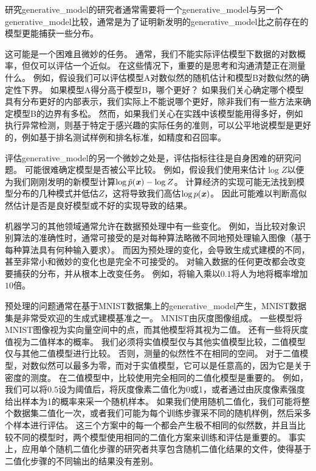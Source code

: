 研究\gls{generative_model}的研究者通常需要将一个\gls{generative_model}与另一个\gls{generative_model}比较，通常是为了证明新发明的\gls{generative_model}比之前存在的模型更能捕获一些分布。

这可能是一个困难且微妙的任务。
通常，我们不能实际评估模型下数据的对数概率，但仅可以评估一个近似。
在这些情况下，重要的是思考和沟通清楚正在测量什么。
例如，假设我们可以评估模型A对数似然的随机估计和模型B对数似然的确定性下界。
如果模型A得分高于模型B，哪个更好？
如果我们关心确定哪个模型具有分布更好的内部表示，我们实际上不能说哪个更好，除非我们有一些方法来确定模型B的边界有多松。
然而，如果我们关心在实践中该模型能用得多好，例如执行异常检测，则基于特定于感兴趣的实际任务的准则，可以公平地说模型是更好的，例如基于排名测试样例和排名标准，如精度和召回率。

评估\gls{generative_model}的另一个微妙之处是，评估指标往往是自身困难的研究问题。 
可能很难确定模型是否被公平比较。
例如，假设我们使用来估计$\log Z$以便为我们刚刚发明的新模型计算$\log \tilde{p}(\boldsymbol{\mathit{x}}) - \log Z$。
计算经济的实现可能无法找到模型分布的几种模式并低估$Z$，这将导致我们高估$\log p(\boldsymbol{\mathit{x}})$。
因此可能难以判断高似然估计是否是良好模型或不好的实现导致的结果。
 
机器学习的其他领域通常允许在数据预处理中有一些变化。
例如，当比较对象识别算法的准确性时，通常可接受的是对每种算法略微不同地预处理输入图像（基于每种算法具有何种输入要求）。
而因为预处理的变化，会导致生成式建模的不同，甚至非常小和微妙的变化也是完全不可接受的。
对输入数据的任何更改都会改变要捕获的分布，并从根本上改变任务。
例如，将输入乘以$0.1$将人为地将概率增加$10$倍。


预处理的问题通常在基于MNIST数据集上的\gls{generative_model}产生，MNIST数据集是非常受欢迎的生成式建模基准之一。
MNIST由灰度图像组成。
一些模型将MNIST图像视为实向量空间中的点，而其他模型将其视为二值。
还有一些将灰度值视为二值样本的概率。
我们必须将实值模型仅与其他实值模型比较，二值模型仅与其他二值模型进行比较。
否则，测量的似然性不在相同的空间。
对于二值模型，对数似然可以最多为零，而对于实值模型，它可以是任意高的，因为它是关于密度的测度。
在二值模型中，比较使用完全相同的二值化模型是重要的。
例如，我们可以将$0.5$设为阈值后，将灰度像素二值化为0或1，或者通过由灰度像素强度给出样本为1的概率来采一个随机样本。
如果我们使用随机二值化，我们可能将整个数据集二值化一次，或者我们可能为每个训练步骤采不同的随机样例，然后采多个样本进行评估。
这三个方案中的每一个都会产生极不相同的似然数，并且当比较不同的模型时，两个模型使用相同的二值化方案来训练和评估是重要的。
事实上，应用单个随机二值化步骤的研究者共享包含随机二值化结果的文件，使得基于二值化步骤的不同输出的结果没有差别。

